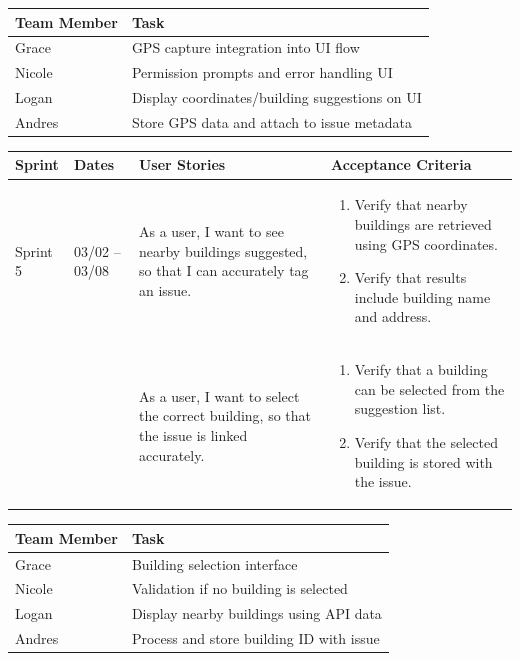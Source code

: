 \documentclass[12pt]{article}
\begin{document}
\vspace{0.5em}

\noindent
\begin{tabular}{|L{2.5cm}|L{12.5cm}|}
\hline
\textbf{Team Member} & \textbf{Task} \\
\hline
Grace & GPS capture integration into UI flow \\
\hline
Nicole & Permission prompts and error handling UI \\
\hline
Logan & Display coordinates/building suggestions on UI \\
\hline
Andres & Store GPS data and attach to issue metadata \\
\hline
\end{tabular}

\vspace{2em}


\vspace{0.5em}

\noindent
\begin{tabular}{|L{1.2cm}|L{1.8cm}|L{5.2cm}|L{6.3cm}|}
\hline
\textbf{Sprint} & \textbf{Dates} & \textbf{User Stories} & \textbf{Acceptance Criteria} \\
\hline
Sprint 5 & 03/02 -- 03/08 &
As a user, I want to see nearby buildings suggested, so that I can accurately tag an issue. &
\begin{enumerate}
    \item Verify that nearby buildings are retrieved using GPS coordinates.
    \item Verify that results include building name and address.
\end{enumerate} \\
& &
As a user, I want to select the correct building, so that the issue is linked accurately. &
\begin{enumerate}
    \item Verify that a building can be selected from the suggestion list.
    \item Verify that the selected building is stored with the issue.
\end{enumerate} \\
\hline
\end{tabular}

\vspace{0.5em}

\noindent
\begin{tabular}{|L{2.5cm}|L{12.5cm}|}
\hline
\textbf{Team Member} & \textbf{Task} \\
\hline
Grace & Building selection interface \\
\hline
Nicole & Validation if no building is selected \\
\hline
Logan & Display nearby buildings using API data \\
\hline
Andres & Process and store building ID with issue \\
\hline
\end{tabular}
\end{document}
